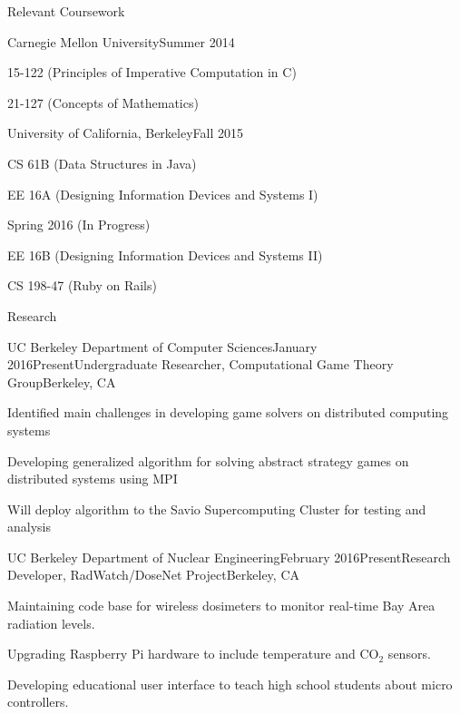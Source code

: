\documentclass{resume} %
\begin{document}
\pagebreak

\begin{rSection}{Relevant Coursework}

\begin{rSubsection}{Carnegie Mellon University}{}{Summer 2014}{}
\item 15-122 (Principles of Imperative Computation in C)
\item 21-127 (Concepts of Mathematics)
\end{rSubsection}

\begin{rSubsection}{University of California, Berkeley}{}{Fall 2015}{}
\item CS 61B (Data Structures in Java)
\item EE 16A (Designing Information Devices and Systems I)
\end{rSubsection}
\begin{rSubsection}{}{}{Spring 2016 (In Progress)}{}
\item EE 16B (Designing Information Devices and Systems II)
\item CS 198-47 (Ruby on Rails)
\end{rSubsection}

\end{rSection}

\begin{rSection}{Research}
\begin{rSubsection}{UC Berkeley Department of Computer Sciences}{January 2016\textminus Present}{Undergraduate Researcher, Computational Game Theory Group}{Berkeley, CA}
\item Identified main challenges in developing game solvers on distributed computing systems
\item Developing generalized algorithm for solving abstract strategy games on distributed systems using MPI
\item Will deploy algorithm to the Savio Supercomputing Cluster for testing and analysis
\end{rSubsection}
\begin{rSubsection}{UC Berkeley Department of Nuclear Engineering}{February 2016\textminus Present}{Research Developer, RadWatch/DoseNet Project}{Berkeley, CA}
\item Maintaining code base for wireless dosimeters to monitor real-time Bay Area radiation levels.
\item Upgrading Raspberry Pi hardware to include temperature and CO$_2$ sensors. 
\item Developing educational user interface to teach high school students about micro controllers.
\end{rSubsection}
\end{rSection}
\end{document}
